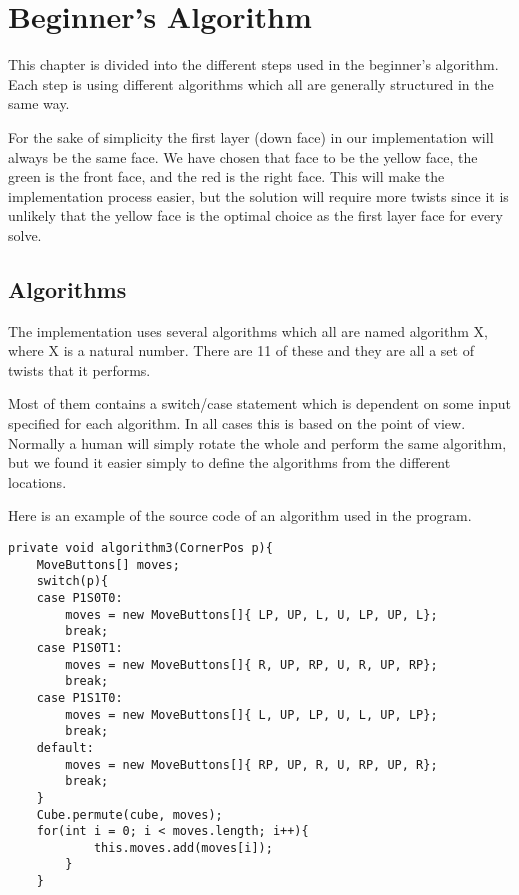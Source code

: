 \chapter{Beginner's Algorithm}
This chapter is divided into the different steps used in the beginner's algorithm.
Each step is using different algorithms which all are generally structured in the same way. 

For the sake of simplicity the first layer (down face) in our implementation will always be the same face. We have chosen that face to be the yellow face, the green is the front face, and the red is the right face. This will make the implementation process easier, but the solution will require more twists since it is unlikely that the yellow face is the optimal choice as the first layer face for every solve.

\section{Algorithms}
The implementation uses several algorithms which all are named algorithm X, where X is a natural number. There are 11 of these and they are all a set of twists that it performs. 

Most of them contains a switch/case statement which is dependent on some input specified for each algorithm. In all cases this is based on the point of view. Normally a human will simply rotate the whole \cube{} and perform the same algorithm, but we found it easier simply to define the algorithms from the different locations.

Here is an example of the source code of an algorithm used in the program.

\begin{lstlisting}[style=sourceCode, caption=\myCaption{This is algorithm 3, which will orientate the corners correctly. The for-loop is only for adding the moves to the console.}, label=src:beginners, float=htb]
private void algorithm3(CornerPos p){
	MoveButtons[] moves;
	switch(p){
	case P1S0T0:
		moves = new MoveButtons[]{ LP, UP, L, U, LP, UP, L};
		break;
	case P1S0T1:
		moves = new MoveButtons[]{ R, UP, RP, U, R, UP, RP};
		break;
	case P1S1T0:
		moves = new MoveButtons[]{ L, UP, LP, U, L, UP, LP};
		break;
	default:
		moves = new MoveButtons[]{ RP, UP, R, U, RP, UP, R};
		break;
	}
	Cube.permute(cube, moves);
	for(int i = 0; i < moves.length; i++){
			this.moves.add(moves[i]);
		}
	}
\end{lstlisting}

